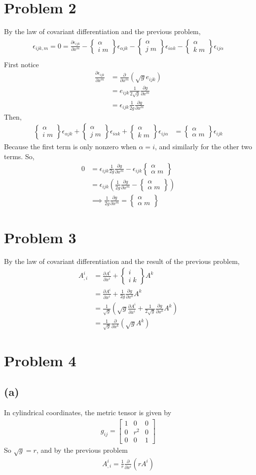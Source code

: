\documentclass[12pt]{article}
\newcommand{\eq}[1]{\begin{align*}#1\end{align*}}
\newcommand{\p}[2]{\frac{\partial#1}{\partial#2}}
\newcommand{\mat}[2]{\left[\begin{array}{#1}#2\end{array}\right]}
\newcommand{\crss}[3]{\left\{\begin{array}{c}#1\\#2\;#3\end{array}\right\}}
\begin{document}
\section*{Problem 2}
By the law of covariant differentiation and the previous problem,
\eq{
	\epsilon_{ijk,m} = 0 = \p{\epsilon_{ijk}}{x^m} - \crss{\alpha}{i}{m}\epsilon_{\alpha jk} - \crss{\alpha}{j}{m}\epsilon_{i\alpha k} - \crss{\alpha}{k}{m}\epsilon_{ij\alpha}\\
}
First notice
\eq{
	\p{\epsilon_{ijk}}{x^m} &= \p{}{x^m}(\sqrt{g} e_{ijk})\\
	&= e_{ijk}\frac{1}{2\sqrt{g}}\p{g}{x^m}\\
	&= \epsilon_{ijk} \frac{1}{2g} \p{g}{x^m}
}
Then,
\eq{
	\crss{\alpha}{i}{m}\epsilon_{\alpha jk} + \crss{\alpha}{j}{m}\epsilon_{i\alpha k} + \crss{\alpha}{k}{m}\epsilon_{ij\alpha} &= \crss{\alpha}{\alpha}{m}\epsilon_{ijk}
}
Because the first term is only nonzero when $\alpha = i$, and similarly for the other two terms.
So,
\eq{
	0 &= \epsilon_{ijk} \frac{1}{2g} \p{g}{x^m} - \epsilon_{ijk}\crss{\alpha}{\alpha}{m}\\
	&= \epsilon_{ijk}\left( \frac{1}{2g} \p{g}{x^m} - \crss{\alpha}{\alpha}{m} \right)\\
	&\implies \frac{1}{2g} \p{g}{x^m} = \crss{\alpha}{\alpha}{m}
}
\section*{Problem 3}
By the law of covariant differentiation and the result of the previous problem,
\eq{
	A^i_{,i} &= \p{A^i}{x^i} + \crss{i}{i}{k}A^k\\
	&= \p{A^i}{x^i} + \frac{1}{2g}\p{g}{x^k}A^k\\
	&= \frac{1}{\sqrt{g}}\left(\sqrt{g}\p{A^i}{x^i} + \frac{1}{2\sqrt{g}}\p{g}{x^k}A^k\right)\\
	&= \frac{1}{\sqrt{g}}\p{}{x^k}\left(\sqrt{g}A^k\right)
}
\section*{Problem 4}
\subsection*{(a)}
In cylindrical coordinates, the metric tensor is given by
\eq{
	g_{ij} = \mat{ccc}{
		1 & 0 & 0\\
		0 & r^2 & 0\\
		0 & 0 & 1
	}
}
So $\sqrt{g} = r$, and by the previous problem
\eq{
	A^i_{,i} = \frac{1}{r}\p{}{x^i}\left(r A^i\right)
}
\end{document}
